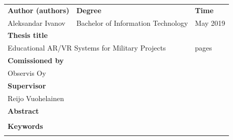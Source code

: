 \documentclass[12pt, a4paper,oneside, nocenter]{thesis}
\newcommand\blankpage{%
    \null
    \thispagestyle{empty}%
    \addtocounter{page}{-1}%
    \newpage}
\begin{document}
    \thispagestyle{empty}
		\noindent
		\newlength{\lengtha}
		\setlength{\lengtha}{.96\textwidth}
    \begin{tabularx}{\linewidth}{|XXXX|}
      \hline
	   \textbf{Author (authors)} &  \textbf{Degree} &  & \textbf{Time} \\
	   Aleksandar Ivanov &  \multicolumn{2}{l}{Bachelor of Information Technology} & May 2019 \\
	   \hline
	   \textbf{Thesis title} & & & \\
	   \multicolumn{3}{|l}{Educational AR/VR Systems for Military Projects} & \pageref{LastPage} pages\\
	  \hline
		\textbf{Comissioned by} & & & \\
		Observis Oy & & & \\
	  \hline
	  \textbf{Supervisor} & & & \\
	  Reijo Vuohelainen & & & \\
	  \hline
		\textbf{Abstract} & & & \\
		\multicolumn{4}{|p{\lengtha}|}{\raggedright \lipsum[1-2]} \\
	  \hline
	  \textbf{Keywords} & & & \\
	  & & & \\
	  \hline
    \end{tabularx}

\newpage%
{
\tableofcontents
}

\newpage%



\end{document}
